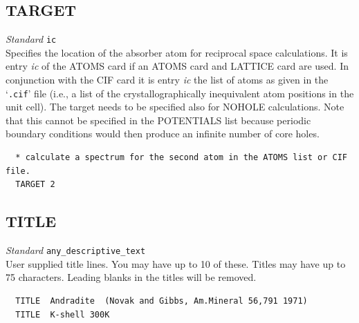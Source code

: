 \documentclass[11pt,oneside]{report} %
\newenvironment{Card}[4]%
      {\vspace{3ex}%
        \subsection{#1}
        \quad\textsl{#3}\newline
        \quad\texttt{#2}\newline%
        \label{card:#4}\\}
      {}
\newcommand{\file}[1]{`\texttt{#1}'}
\begin{document}
\begin{Card}{TARGET}{ic}{Standard}{tar}
  Specifies the location of the absorber atom for reciprocal space calculations.  It is entry {\it ic} of the ATOMS card if an ATOMS card and LATTICE card are used.  In conjunction with the CIF card it is entry {\it ic} the list of atoms as given in the \file{.cif} file (i.e., a list of the crystallographically inequivalent atom positions in the unit cell).  The target needs to be specified also for NOHOLE
  calculations.  Note that this cannot be specified in the POTENTIALS list because periodic boundary conditions would then produce an infinite number of core holes.
\begin{verbatim}
  * calculate a spectrum for the second atom in the ATOMS list or CIF file.
  TARGET 2
\end{verbatim}
\end{Card}



\begin{Card}{TITLE}{any\_descriptive\_text}{Standard}{tit}
  User supplied title lines. You may have up to 10 of these. Titles
  may have up to 75 characters. Leading blanks in the titles will be
  removed.
\begin{verbatim}
  TITLE  Andradite  (Novak and Gibbs, Am.Mineral 56,791 1971)
  TITLE  K-shell 300K
\end{verbatim}
\end{Card}
\end{document}
